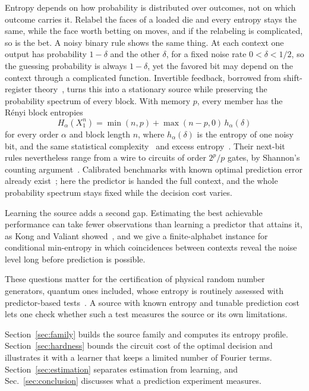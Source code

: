 \documentclass[11pt,a4paper]{article}
\begin{document}
Entropy depends on how probability is distributed over outcomes, not on which outcome carries it. Relabel the faces of a loaded die and every entropy stays the same, while the face worth betting on moves, and if the relabeling is complicated, so is the bet. A noisy binary rule shows the same thing. At each context one output has probability \(1-\delta\) and the other \(\delta\), for a fixed noise rate \(0<\delta<1/2\), so the guessing probability is always \(1-\delta\), yet the favored bit may depend on the context through a complicated function. Invertible feedback, borrowed from shift-register theory~\cite{golomb2014shift,dabrowski2014searching}, turns this into a stationary source while preserving the probability spectrum of every block. With memory $p$, every member has the R\'enyi block entropies
\begin{equation*}
 H_\alpha(X_1^n)=\min(n,p)+\max(n-p,0)\,h_\alpha(\delta)
\end{equation*}
for every order $\alpha$ and block length $n$, where $h_\alpha(\delta)$ is the entropy of one noisy bit, and the same statistical complexity~\cite{crutchfield1989inferring,shalizi2001computational} and excess entropy~\cite{grassberger1986toward,crutchfield2003regularities,bialek2001predictability}. Their next-bit rules nevertheless range from a wire to circuits of order $2^p/p$ gates, by Shannon's counting argument~\cite{shannon1949synthesis,jukna2012boolean}. Calibrated benchmarks with known optimal prediction error already exist~\cite{marzen2024benchmarks}; here the predictor is handed the full context, and the whole probability spectrum stays fixed while the decision cost varies.

Learning the source adds a second gap. Estimating the best achievable performance can take fewer observations than learning a predictor that attains it, as Kong and Valiant showed~\cite{kong2018learnability}, and we give a finite-alphabet instance for conditional min-entropy in which coincidences between contexts reveal the noise level long before prediction is possible.

These questions matter for the certification of physical random number generators, quantum ones included, whose entropy is routinely assessed with predictor-based tests~\cite{kelsey2015predictive,sonmez2018recommendation}. A source with known entropy and tunable prediction cost lets one check whether such a test measures the source or its own limitations.

Section~\ref{sec:family} builds the source family and computes its entropy profile. Section~\ref{sec:hardness} bounds the circuit cost of the optimal decision and illustrates it with a learner that keeps a limited number of Fourier terms. Section~\ref{sec:estimation} separates estimation from learning, and Sec.~\ref{sec:conclusion} discusses what a prediction experiment measures.
\end{document}
